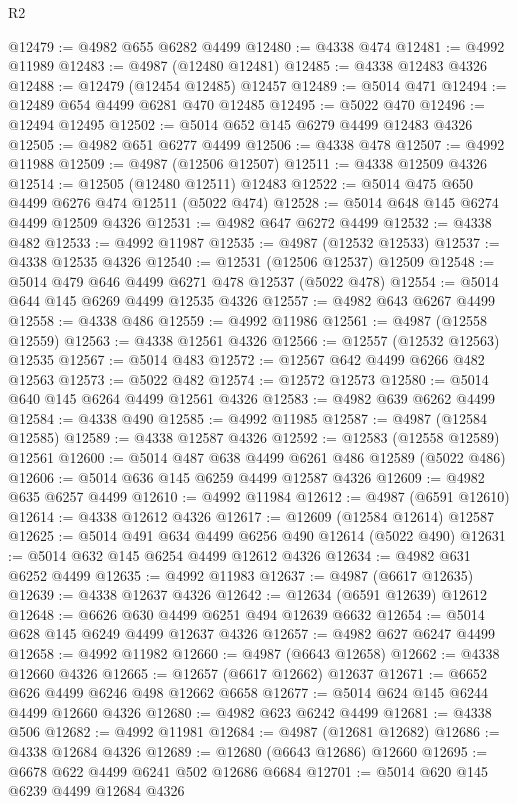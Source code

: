 \begin{lexlean}{R2}
\begin{coremodule}
@12479 := @4982 @655 @6282 @4499
@12480 := @4338 @474
@12481 := @4992 @11989
@12483 := @4987 (@12480 @12481)
@12485 := @4338 @12483 @4326
@12488 := @12479 (@12454 @12485) @12457
@12489 := @5014 @471
@12494 := @12489 @654 @4499 @6281 @470 @12485
@12495 := @5022 @470
@12496 := @12494 @12495
@12502 := @5014 @652 @145 @6279 @4499 @12483 @4326
@12505 := @4982 @651 @6277 @4499
@12506 := @4338 @478
@12507 := @4992 @11988
@12509 := @4987 (@12506 @12507)
@12511 := @4338 @12509 @4326
@12514 := @12505 (@12480 @12511) @12483
@12522 := @5014 @475 @650 @4499 @6276 @474 @12511 (@5022 @474)
@12528 := @5014 @648 @145 @6274 @4499 @12509 @4326
@12531 := @4982 @647 @6272 @4499
@12532 := @4338 @482
@12533 := @4992 @11987
@12535 := @4987 (@12532 @12533)
@12537 := @4338 @12535 @4326
@12540 := @12531 (@12506 @12537) @12509
@12548 := @5014 @479 @646 @4499 @6271 @478 @12537 (@5022 @478)
@12554 := @5014 @644 @145 @6269 @4499 @12535 @4326
@12557 := @4982 @643 @6267 @4499
@12558 := @4338 @486
@12559 := @4992 @11986
@12561 := @4987 (@12558 @12559)
@12563 := @4338 @12561 @4326
@12566 := @12557 (@12532 @12563) @12535
@12567 := @5014 @483
@12572 := @12567 @642 @4499 @6266 @482 @12563
@12573 := @5022 @482
@12574 := @12572 @12573
@12580 := @5014 @640 @145 @6264 @4499 @12561 @4326
@12583 := @4982 @639 @6262 @4499
@12584 := @4338 @490
@12585 := @4992 @11985
@12587 := @4987 (@12584 @12585)
@12589 := @4338 @12587 @4326
@12592 := @12583 (@12558 @12589) @12561
@12600 := @5014 @487 @638 @4499 @6261 @486 @12589 (@5022 @486)
@12606 := @5014 @636 @145 @6259 @4499 @12587 @4326
@12609 := @4982 @635 @6257 @4499
@12610 := @4992 @11984
@12612 := @4987 (@6591 @12610)
@12614 := @4338 @12612 @4326
@12617 := @12609 (@12584 @12614) @12587
@12625 := @5014 @491 @634 @4499 @6256 @490 @12614 (@5022 @490)
@12631 := @5014 @632 @145 @6254 @4499 @12612 @4326
@12634 := @4982 @631 @6252 @4499
@12635 := @4992 @11983
@12637 := @4987 (@6617 @12635)
@12639 := @4338 @12637 @4326
@12642 := @12634 (@6591 @12639) @12612
@12648 := @6626 @630 @4499 @6251 @494 @12639 @6632
@12654 := @5014 @628 @145 @6249 @4499 @12637 @4326
@12657 := @4982 @627 @6247 @4499
@12658 := @4992 @11982
@12660 := @4987 (@6643 @12658)
@12662 := @4338 @12660 @4326
@12665 := @12657 (@6617 @12662) @12637
@12671 := @6652 @626 @4499 @6246 @498 @12662 @6658
@12677 := @5014 @624 @145 @6244 @4499 @12660 @4326
@12680 := @4982 @623 @6242 @4499
@12681 := @4338 @506
@12682 := @4992 @11981
@12684 := @4987 (@12681 @12682)
@12686 := @4338 @12684 @4326
@12689 := @12680 (@6643 @12686) @12660
@12695 := @6678 @622 @4499 @6241 @502 @12686 @6684
@12701 := @5014 @620 @145 @6239 @4499 @12684 @4326

\end{coremodule}
\end{lexlean}
